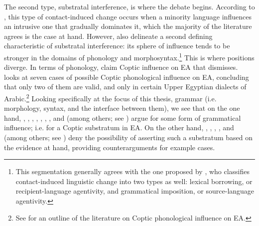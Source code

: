 \documentclass[12pt,a4paper]{article}
\newcounter{example}
\begin{document}
The second type, substratal interference, is where the debate begins. According to \textcite{thomason_language_1988}, this type of contact-induced change occurs when a minority language influences an intrusive one that gradually dominates it, which the majority of the literature agrees is the case at hand. However, \textcite{thomason_language_1988} also delineate a second defining characteristic of substratal interference: its sphere of influence tends to be stronger in the domains of phonology and morphosyntax.\footnote{This segmentation generally agrees with the one proposed by \textcite{van_coetsem_loan_1988}, who classifies contact-induced linguistic change into two types as well: lexical borrowing, or recipient-language agentivity, and grammatical imposition, or source-language agentivity.} This is where positions diverge. In terms of phonology, \textcite{worrell_coptic_1934, prince_modern_1902, ishaq_phonetics_1975} claim Coptic influence on EA that \textcite{behnstedt_coptic_2011} dismisses. \textcite{bishai_nature_1961} looks at seven cases of possible Coptic phonological influence on EA, concluding that only two of them are valid, and only in certain Upper Egyptian dialects of Arabic.\footnote{See \textcite{abdelrahman_linguistic_2023} for an outline of the literature on Coptic phonological influence on EA.} Looking specifically at the focus of this thesis, grammar (i.e. morphology, syntax, and the interface between them), we see that on the one hand, \textcite{praetorius_koptische_1901}, \textcite{prince_modern_1902}, \textcite{littmann_koptischer_1902}, \textcite{sobhy_common_1950}, \textcite{bishai_notes_1960,bishai_nature_1961,bishai_coptic_1962,bishai_coptic_1964}, \textcite{ishaq_phonetics_1975}, \textcite{lucas_contact_2010}, and \textcite{abdelrahman_linguistic_2023} (among others; see \textcite{osman_methodological_2021}) argue for some form of grammatical influence; i.e. for a Coptic substratum in EA. On the other hand, \textcite{galtier_influence_1902}, \textcite{oleary_notes_1934}, \textcite{worrell_coptic_1934}, \textcite{palva_notes_1969}, and \textcite{rubenson_transition_1996} (among others; see \textcite{palva_notes_1969}) deny the possibility of asserting such a substratum based on the evidence at hand, providing counterarguments for example cases.
\end{document}
